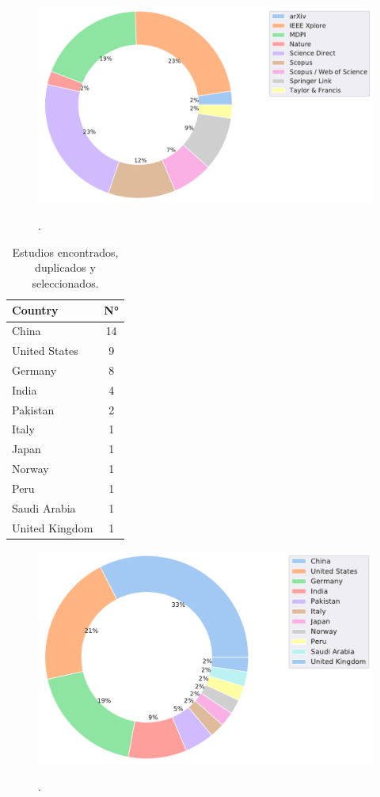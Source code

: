 \documentclass{article}
\begin{document}
\begin{figure}[H]
    \centering
    \includegraphics[width=.65\textwidth]{images/fr_publisher.pdf}
    \label{fig:fr_publiser}
    \caption{.}
\end{figure}

\begin{table}[H]
    \centering
    \caption{Estudios encontrados, duplicados y seleccionados.}
    \hspace{1cm}
    \label{tab:result}
    \begin{tabularx}{\textwidth}{Xc}
        \hline
        \textbf{Country} & \textbf{N°} \\ \hline
        China            & 14          \\
        United States    & 9           \\
        Germany          & 8           \\
        India            & 4           \\
        Pakistan         & 2           \\
        Italy            & 1           \\
        Japan            & 1           \\
        Norway           & 1           \\
        Peru             & 1           \\
        Saudi Arabia     & 1           \\
        United Kingdom   & 1           \\  \hline
    \end{tabularx}
\end{table}

\begin{figure}[H]
    \centering
    \includegraphics[width=.65\textwidth]{images/fr_country.pdf}
    \label{fig:frog}
    \caption{.}
\end{figure}
\end{document}
